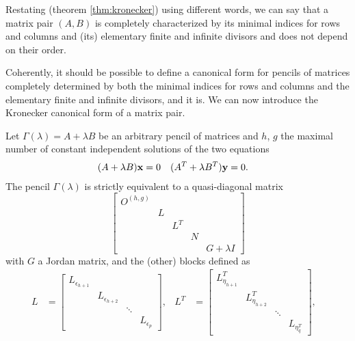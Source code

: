 \begin{remark}
    Restating  (theorem \ref{thm:kronecker}) using different words, we can say that a matrix pair
    \((A, B)\) is completely characterized by its minimal indices for rows and columns and (its) elementary finite and
    infinite divisors and does not depend on their order.
\end{remark}

Coherently, it should be possible to define a canonical form for pencils of matrices completely determined by both
the minimal indices for rows and columns and the elementary finite and infinite divisors, and it is. We can now introduce
the Kronecker canonical form of a matrix pair.

\begin{theorem}\label{thm:kcf}
    Let \(\Gamma(\lambda) = A + \lambda B\) be an arbitrary pencil of matrices and \(h\), \(g\) the maximal number of constant
    independent solutions of the two equations
    \begin{align*}
        (A + \lambda B)\vb{x} &= 0 & (A^T + \lambda B^T)\vb{y} &= 0.
    \end{align*}
    The pencil \(\Gamma(\lambda)\) is strictly equivalent to a quasi-diagonal matrix
    \[
        \begin{bmatrix}
            O^{(h, g)} \\
            & L \\
            & & L^T \\
            & & & N \\
            & & & & G + \lambda I
        \end{bmatrix}
    \]
    with \(G\) a Jordan matrix, and the (other) blocks defined as
    \begin{align*}
        L &= \begin{bmatrix}
            L_{\epsilon_{h+1}} \\
            & L_{\epsilon_{h+2}} \\
            & & \ddots \\
            & & & L_{\epsilon_{p}}
        \end{bmatrix}, &
        L^T &= \begin{bmatrix}
            L_{\eta_{h+1}}^T \\
            & L_{\eta_{h+2}}^T \\
            & & \ddots \\
            & & & L_{\eta_{q}^T}
        \end{bmatrix}, &\\

\end{align*}
\end{theorem}
